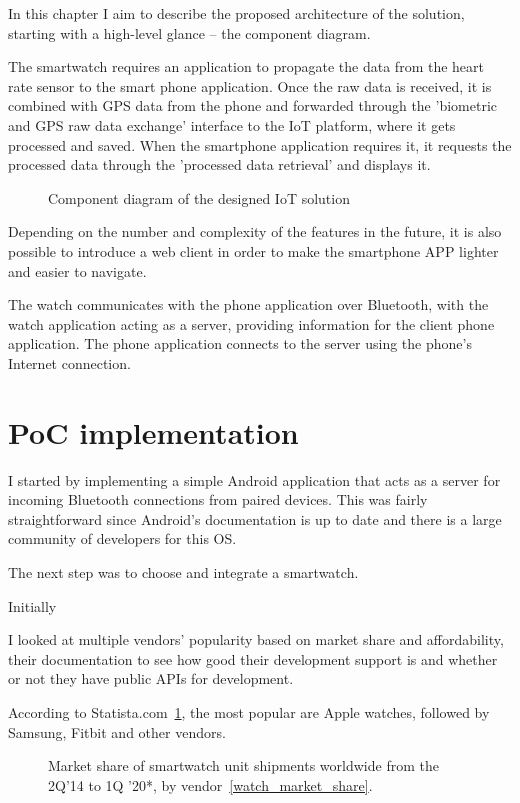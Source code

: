 In this chapter I aim to describe the proposed architecture of the solution, starting with a high-level glance -- the component diagram.

The smartwatch requires an application to propagate the data from the heart rate sensor to the smart phone application.
Once the raw data is received, it is combined with GPS data from the phone and forwarded through the 'biometric and GPS raw data exchange' interface to the IoT platform, where it gets processed and saved.
When the smartphone application requires it, it requests the processed data through the 'processed data retrieval' and displays it.

\begin{figure}[h]
    \caption{Component diagram of the designed IoT solution}
\end{figure}

Depending on the number and complexity of the features in the future, it is also possible to introduce a web client in order to make the smartphone APP lighter and easier to navigate.

The watch communicates with the phone application over Bluetooth, with the watch application acting as a server, providing information for the client phone application.
The phone application connects to the server using the phone's Internet connection.

\section{PoC implementation}

I started by implementing a simple Android application that acts as a server for incoming Bluetooth connections from paired devices.
This was fairly straightforward since Android's documentation is up to date and there is a large community of developers for this OS.

The next step was to choose and integrate a smartwatch.

Initially 

I looked at multiple vendors' popularity based on market share and affordability, their documentation to see how good their development support is and whether or not they have public APIs for development.

According to Statista.com~\ref{fig:watch_market_share}, the most popular are Apple watches, followed by Samsung, Fitbit and other vendors.

\begin{figure}[h]
    \caption{Market share of smartwatch unit shipments worldwide from the 2Q'14 to 1Q '20*, by vendor~\ref{watch_market_share}.}
    \label{fig:watch_market_share}
\end{figure}


